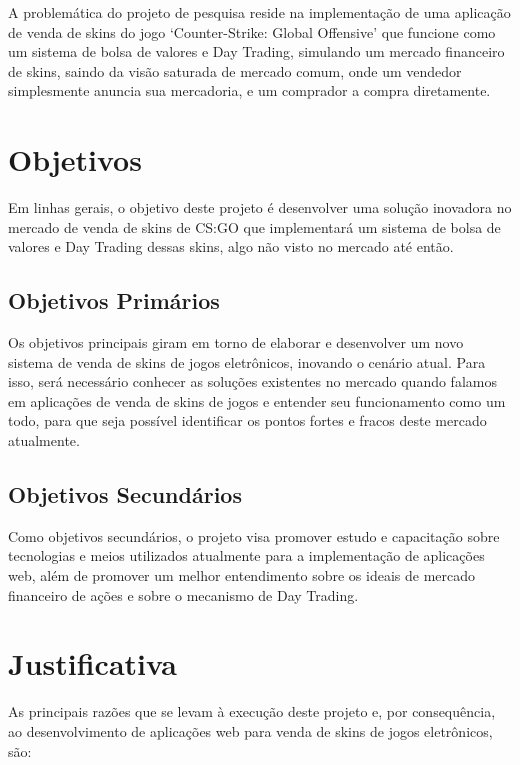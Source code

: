 A problemática do projeto de pesquisa reside na implementação de uma aplicação de venda de skins do jogo ‘Counter-Strike: Global Offensive’ que funcione como um sistema de bolsa de valores e Day Trading, simulando um mercado financeiro de skins, saindo da visão saturada de mercado comum, onde um vendedor simplesmente anuncia sua mercadoria, e um comprador a compra diretamente.

\section{Objetivos}
Em linhas gerais, o objetivo deste projeto é desenvolver uma solução inovadora no mercado de venda de skins de CS:GO que implementará um sistema de bolsa de valores e Day Trading dessas skins, algo não visto no mercado até então.

\subsection{Objetivos Primários}
Os objetivos principais giram em torno de elaborar e desenvolver um novo sistema de venda de skins de jogos eletrônicos, inovando o cenário atual. Para isso, será necessário conhecer as soluções existentes no mercado quando falamos em aplicações de venda de skins de jogos e entender seu funcionamento como um todo, para que seja possível identificar os pontos fortes e fracos deste mercado atualmente.

\subsection{Objetivos Secundários}
Como objetivos secundários, o projeto visa promover estudo e capacitação sobre tecnologias e meios utilizados atualmente para a implementação de aplicações web, além de promover um melhor entendimento sobre os ideais de mercado financeiro de ações e sobre o mecanismo de Day Trading.

\section{Justificativa}
As principais razões que se levam à execução deste projeto e, por consequência, ao desenvolvimento de aplicações web para venda de skins de jogos eletrônicos, são: 

